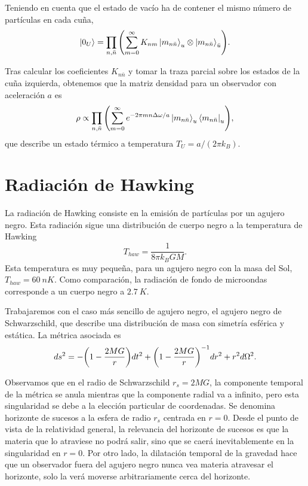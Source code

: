 Teniendo en cuenta que el estado de vacío ha de contener el mismo número de partículas en cada cuña,
\begin{equation}
  \ket{0_U} = \prod_{n,\bar n} \qty(\sum_{m=0}^\infty K_{nm} \ket{m_{n\bar n}}_u\otimes \ket{m_{n\bar n}}_{\bar u}).
\end{equation}

Tras calcular los coeficientes $K_{n \bar n}$ y tomar la traza parcial sobre los estados de
la cuña izquierda, obtenemos que la matriz densidad para un observador con aceleración $a$ es
\begin{equation}
  \rho  \propto \prod_{n,\bar n} \qty(\sum_{m=0}^\infty e^{-2\pi m n\Delta  \omega/a}\ket{m_{n\bar n}}_u \bra{m_{n\bar n}}_u),
\end{equation}
que describe un estado térmico a temperatura $T_U=a/(2\pi k_B)$.

\section{Radiación de Hawking}
La radiación de Hawking consiste en la emisión de partículas por un agujero negro.
Esta radiación sigue una distribución de cuerpo negro a la temperatura de Hawking
\begin{equation}
  T_{haw}= \frac{1}{8\pi k_B G M}.
\end{equation}
Esta temperatura es muy pequeña, para un agujero negro con la masa del Sol, $T_{haw}=\SI{60}{nK}$.
Como comparación, la radiación de fondo de microondas corresponde a un cuerpo negro a $\SI{2.7}{K}$.

Trabajaremos con el caso más sencillo de agujero negro, el agujero negro de Schwarzschild, que
describe una distribución de masa con simetría esférica y estática. La métrica asociada
es 
\begin{equation}
  ds^2= -\qty(1-\frac{2MG}{r})dt^2+\qty(1-\frac{2MG}{r})^{-1}dr^2+r^2d\Omega^2.
\end{equation}

Observamos que en el radio de Schwarzschild $r_s=2MG$, la componente temporal de la 
métrica se anula mientras que la componente radial va a infinito, pero esta singularidad se debe
a la elección particular de coordenadas.
Se denomina horizonte de sucesos a la esfera de radio $r_s$ centrada en $r=0$.
Desde el punto de vista de la relatividad general, la  relevancia del horizonte de sucesos es
que la materia que lo atraviese no podrá salir, sino que se caerá inevitablemente en la singularidad en $r=0$.
Por otro lado, la dilatación temporal de la gravedad  hace que un observador fuera del agujero negro nunca
vea materia atravesar el horizonte, solo la verá moverse arbitrariamente cerca del horizonte.

